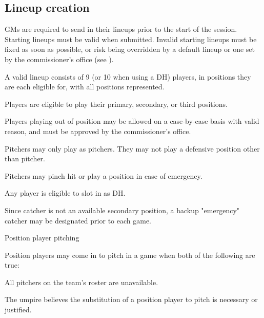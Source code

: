 \subsection{Lineup creation}
\label{sec:lineups}
\begin{deepEnumerate}
	\item GMs are required to send in their lineups prior to the start of the session.
	Starting lineups must be valid when submitted.
	Invalid starting lineups must be fixed as soon as possible,
	or risk being overridden by a default lineup
	or one set by the commissioner's office (see ). 
	\begin{deepEnumerate}
		\item A valid lineup consists of 9 (or 10 when using a DH) players,
		in positions they are each eligible for, with all positions represented.
		\begin{deepEnumerate}
			\item Players are eligible to play their primary, secondary, or third positions.
			\item Players playing out of position may be allowed 
			on a case-by-case basis with valid reason,
			and must be approved by the commissioner's office.
		\end{deepEnumerate}
		\item Pitchers may only play as pitchers.
		They may not play a defensive position other than pitcher.
		\begin{deepEnumerate}
			\item Pitchers may pinch hit or play a position in case of emergency.
		\end{deepEnumerate}
		\item Any player is eligible to slot in as DH.
		\item Since catcher is not an available secondary position,
		a backup "emergency" catcher may be designated prior to each game.
		\item Position player pitching
		\begin{deepEnumerate}
			\item Position players may come in to pitch in a game
			when both of the following are true:
			\begin{deepEnumerate}
				\item All pitchers on the team's roster are unavailable.
				\item The umpire believes the substitution 
				of a position player to pitch is necessary or justified.
			\end{deepEnumerate}

\end{deepEnumerate}
\end{deepEnumerate}
\end{deepEnumerate}
